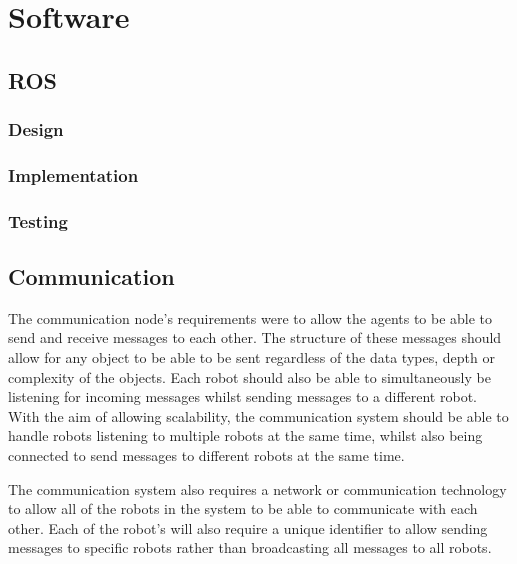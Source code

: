 
\chapter{Software}\label{software}




\section{ROS}\label{soft/ROS}

\subsection{Design}\label{soft/ROS/design}

\subsection{Implementation}\label{soft/ROS/impl}

\subsection{Testing}\label{soft/ROS/test}



\section{Communication}\label{soft/comms}
The communication node's requirements were to allow the agents to 
be able to send and receive messages to each other. The structure 
of these messages should allow for any object to be able to be sent 
regardless of the data types, depth or complexity of the objects. 
Each robot should also be able to simultaneously be listening for 
incoming messages whilst sending messages to a different robot. 
With the aim of allowing scalability, the communication system 
should be able to handle robots listening to multiple robots at the 
same time, whilst also being connected to send messages to different 
robots at the same time. 

The communication system also requires a network or communication 
technology to allow all of the robots in the system to be able to 
communicate with each other. Each of the robot's will also require 
a unique identifier to allow sending messages to specific robots 
rather than broadcasting all messages to all robots. 

